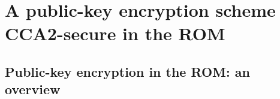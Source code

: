 \chapter{A public-key encryption scheme CCA2-secure in the ROM}
\label{CH:Encryption}

\section{Public-key encryption in the ROM: an overview}
\label{SEC:EncOverview}

